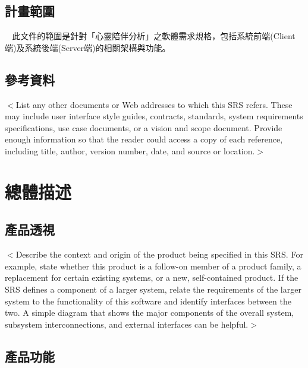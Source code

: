\documentclass[12pt]{scrreprt}
\begin{document}
\section{計畫範圍}

$~~~~$此文件的範圍是針對「心靈陪伴分析」之軟體需求規格，包括系統前端(Client端)及系統後端(Server端)的相關架構與功能。

\section{參考資料}
$<$List any other documents or Web addresses to which this SRS refers. These may 
include user interface style guides, contracts, standards, system requirements 
specifications, use case documents, or a vision and scope document. Provide 
enough information so that the reader could access a copy of each reference, 
including title, author, version number, date, and source or location.$>$


\chapter{總體描述}

\section{產品透視} %
$<$Describe the context and origin of the product being specified in this SRS.  
For example, state whether this product is a follow-on member of a product 
family, a replacement for certain existing systems, or a new, self-contained 
product. If the SRS defines a component of a larger system, relate the 
requirements of the larger system to the functionality of this software and 
identify interfaces between the two. A simple diagram that shows the major 
components of the overall system, subsystem interconnections, and external 
interfaces can be helpful.$>$

\section{產品功能} %
\end{document}
